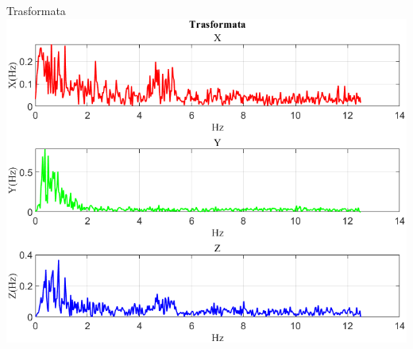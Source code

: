 \documentclass[beamer]{standalone}
\begin{document}
	
%	
%	
%	
%	
%	
	
	\begin{frame}{{Trasformata}}
		\centering\includegraphics[height=.8\textheight]{figure/Mag/Trasformata/Trasformata}
	\end{frame}
	
\end{document}
